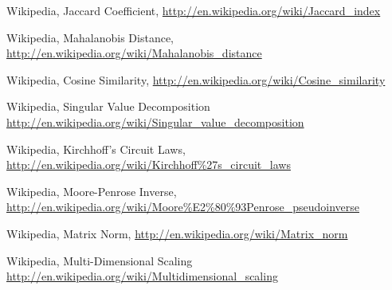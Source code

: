 	Wikipedia, Jaccard Coefficient, 
	\url{http://en.wikipedia.org/wiki/Jaccard_index}
	
	Wikipedia, Mahalanobis Distance, 
	\url{http://en.wikipedia.org/wiki/Mahalanobis_distance}
	
	Wikipedia, Cosine Similarity, 
	\url{http://en.wikipedia.org/wiki/Cosine_similarity}
	
	Wikipedia, Singular Value Decomposition
	\url{http://en.wikipedia.org/wiki/Singular_value_decomposition}
	
	Wikipedia, Kirchhoff's Circuit Laws, 
	\url{http://en.wikipedia.org/wiki/Kirchhoff%27s_circuit_laws}
	
	Wikipedia, Moore-Penrose Inverse, 
	\url{http://en.wikipedia.org/wiki/Moore%E2%80%93Penrose_pseudoinverse}
	
	Wikipedia, Matrix Norm, 
	\url{http://en.wikipedia.org/wiki/Matrix_norm}
	
	Wikipedia, Multi-Dimensional Scaling
	\url{http://en.wikipedia.org/wiki/Multidimensional_scaling}
